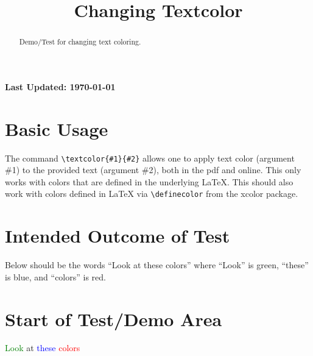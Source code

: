 \documentclass{ximera}
\title{Changing Textcolor}
\begin{document}
\begin{abstract}
    Demo/Test for changing text coloring.
\end{abstract}
\maketitle

{{\Huge \bfseries Last Updated: \today}} \\


\section{Basic Usage}
The command \verb|\textcolor{#1}{#2}| allows one to apply text color (argument \#1) to the provided text (argument \#2), both in the pdf and online. 
This only works with colors that are defined in the underlying LaTeX. This should also work with colors defined in LaTeX via \verb|\definecolor| from
the xcolor package. 

\section{Intended Outcome of Test}
Below should be the words ``Look at these colors'' where ``Look'' is green, ``these'' is blue, and ``colors'' is red.

\section{Start of Test/Demo Area}
\textcolor{green}{Look} at \textcolor{blue}{these} \textcolor{red}{colors}

\hrulefill
\end{document}
